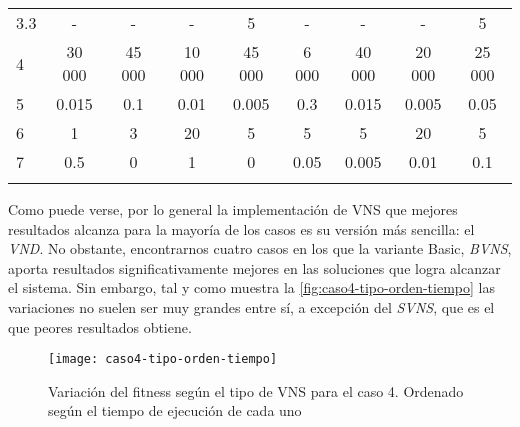 \begin{table}[h]
{\begin{tabular}{lcccccccc}
			3.3       &          -           &          -           &          -           &          5           &          -           &          -           &          -           &          5           \\
			4         &        30 000        &        45 000        &        10 000        &        45 000        &        6 000         &        40 000        &        20 000        &        25 000        \\
			5         &        0.015         &         0.1          &         0.01         &        0.005         &         0.3          &        0.015         &        0.005         &         0.05         \\
			6         &          1           &          3           &          20          &          5           &          5           &          5           &          20          &          5           \\
			7         &         0.5          &          0           &          1           &          0           &         0.05         &        0.005         &         0.01         &         0.1          \\ \hline
			          & \multicolumn{1}{l}{} & \multicolumn{1}{l}{} & \multicolumn{1}{l}{} & \multicolumn{1}{l}{} & \multicolumn{1}{l}{} & \multicolumn{1}{l}{} & \multicolumn{1}{l}{} & \multicolumn{1}{l}{}
		\end{tabular}%
	}
\end{table}

Como puede verse, por lo general la implementación de VNS que mejores resultados alcanza para la mayoría de los casos es su versión más sencilla: el \textit{VND}. No obstante, encontrarnos cuatro casos en los que la variante Basic, \textit{BVNS}, aporta resultados significativamente mejores en las soluciones que logra alcanzar el sistema. Sin embargo, tal y como muestra la \autoref{fig:caso4-tipo-orden-tiempo} las variaciones no suelen ser muy grandes entre sí, a excepción del \textit{SVNS}, que es el que peores resultados obtiene.

\begin{figure}
	\centering
	\texttt{[image: caso4-tipo-orden-tiempo]}
	\caption{Variación del fitness según el tipo de VNS para el caso 4. Ordenado según el tiempo de ejecución de cada uno}
	\label{fig:caso4-tipo-orden-tiempo}
\end{figure}

